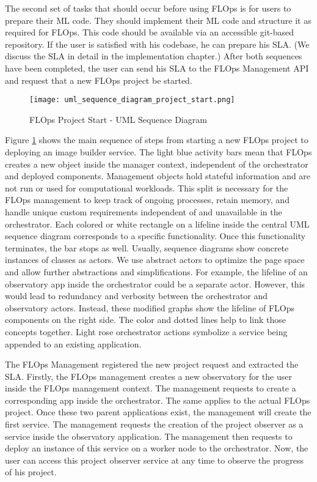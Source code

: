 The second set of tasks that should occur before using FLOps is for users to prepare their ML code.
They should implement their ML code and structure it as required for FLOps.
This code should be available via an accessible git-based repository.
If the user is satisfied with his codebase, he can prepare his SLA.
(We discuss the SLA in detail in the implementation chapter.)
After both sequences have been completed, the user can send his SLA to the FLOps Management API and request that a new FLOps project be started.

\begin{figure}[h]
    \begin{adjustwidth}{-0.2\paperwidth}{-0.2\paperwidth}
        \centering
        \texttt{[image: uml\_sequence\_diagram\_project\_start.png]}
        \caption{FLOps Project Start - UML Sequence Diagram}
        \label{fig:uml_sequence_project_start}
    \end{adjustwidth}
\end{figure}

Figure \ref{fig:uml_sequence_project_start} shows the main sequence of steps from starting a new FLOps project to deploying an image builder service.
The light blue activity bars mean that FLOps creates a new object inside the manager context, independent of the orchestrator and deployed components.
Management objects hold stateful information and are not run or used for computational workloads.
This split is necessary for the FLOps management to keep track of ongoing processes, retain memory, and handle unique custom requirements independent of and unavailable in the orchestrator.
Each colored or white rectangle on a lifeline inside the central UML sequence diagram corresponds to a specific functionality.
Once this functionality terminates, the bar stops as well.
Usually, sequence diagrams show concrete instances of classes as actors.
We use abstract actors to optimize the page space and allow further abstractions and simplifications.
For example, the lifeline of an observatory app inside the orchestrator could be a separate actor.
However, this would lead to redundancy and verbosity between the orchestrator and observatory actors.
Instead, these modified graphs show the lifeline of FLOps components on the right side.
The color and dotted lines help to link those concepts together.
Light rose orchestrator actions symbolize a service being appended to an existing application.

The FLOps Management registered the new project request and extracted the SLA.
Firstly, the FLOps management creates a new observatory for the user inside the FLOps management context.
The management requests to create a corresponding app inside the orchestrator.
The same applies to the actual FLOps project.
Once these two parent applications exist, the management will create the first service.
The management requests the creation of the project observer as a service inside the observatory application.
The management then requests to deploy an instance of this service on a worker node to the orchestrator.
Now, the user can access this project observer service at any time to observe the progress of his project.


